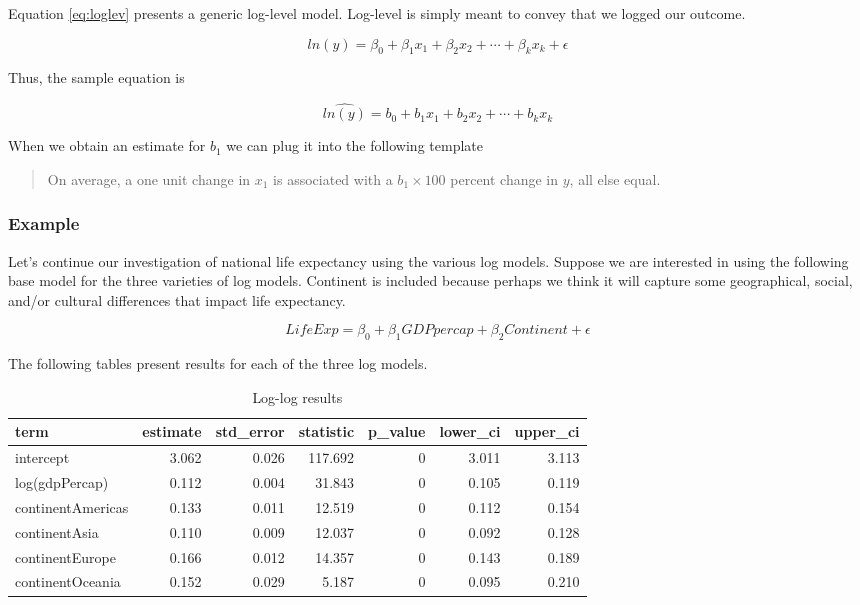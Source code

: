 \documentclass[
]{book}
\begin{document}
Equation \eqref{eq:loglev} presents a generic log-level model. Log-level is simply meant to convey that we logged our outcome.

\begin{equation}
ln(y)=\beta_0 + \beta_1x_1 + \beta_2x_2 + \cdots + \beta_kx_k + \epsilon
\label{eq:loglev}
\end{equation}

Thus, the sample equation is

\begin{equation}
\hat{ln(y)}=b_0 + b_1x_1 + b_2x_2 + \cdots + b_kx_k
\label{eq:loglevsamp}
\end{equation}

When we obtain an estimate for \(b_1\) we can plug it into the following template

\begin{quote}
On average, a one unit change in \(x_1\) is associated with a \(b_1 \times 100\) percent change in \(y\), all else equal.
\end{quote}

\hypertarget{example}{%
\subsubsection*{Example}\label{example}}


Let's continue our investigation of national life expectancy using the various log models. Suppose we are interested in using the following base model for the three varieties of log models. Continent is included because perhaps we think it will capture some geographical, social, and/or cultural differences that impact life expectancy.

\begin{equation}
LifeExp=\beta_0 + \beta_1GDPpercap + \beta_2Continent + \epsilon
\label{eq:logex}
\end{equation}

The following tables present results for each of the three log models.

\begin{table}

\caption{\label{tab:loglogtab}Log-log results}
\centering
\begin{tabular}[t]{l|r|r|r|r|r|r}
\hline
term & estimate & std\_error & statistic & p\_value & lower\_ci & upper\_ci\\
\hline
intercept & 3.062 & 0.026 & 117.692 & 0 & 3.011 & 3.113\\
\hline
log(gdpPercap) & 0.112 & 0.004 & 31.843 & 0 & 0.105 & 0.119\\
\hline
continentAmericas & 0.133 & 0.011 & 12.519 & 0 & 0.112 & 0.154\\
\hline
continentAsia & 0.110 & 0.009 & 12.037 & 0 & 0.092 & 0.128\\
\hline
continentEurope & 0.166 & 0.012 & 14.357 & 0 & 0.143 & 0.189\\
\hline
continentOceania & 0.152 & 0.029 & 5.187 & 0 & 0.095 & 0.210\\
\hline
\end{tabular}
\end{table}
\end{document}
